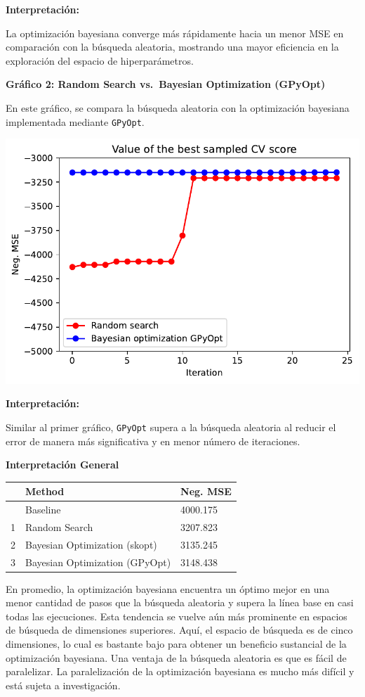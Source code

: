 \documentclass[
  12pt,
  letterpaper,
  DIV=11,
  numbers=noendperiod]{scrartcl}
\begin{document}
\textbf{Interpretación:}

La optimización bayesiana converge más rápidamente hacia un menor MSE en
comparación con la búsqueda aleatoria, mostrando una mayor eficiencia en
la exploración del espacio de hiperparámetros.

\newpage

\textbf{Gráfico 2: Random Search vs.~Bayesian Optimization (GPyOpt)}

En este gráfico, se compara la búsqueda aleatoria con la optimización
bayesiana implementada mediante \texttt{GPyOpt}.

\includegraphics{ProyFinal_OptBayesiana_2024_y_files/figure-pdf/cell-18-output-1.pdf}

\textbf{Interpretación:}

Similar al primer gráfico, \texttt{GPyOpt} supera a la búsqueda
aleatoria al reducir el error de manera más significativa y en menor
número de iteraciones.

\textbf{Interpretación General}

\begin{longtable}[]{@{}lll@{}}
\toprule\noalign{}
& Method & Neg. MSE \\
\midrule\noalign{}
\endhead
\bottomrule\noalign{}
\endlastfoot
0 & Baseline & 4000.175 \\
1 & Random Search & 3207.823 \\
2 & Bayesian Optimization (skopt) & 3135.245 \\
3 & Bayesian Optimization (GPyOpt) & 3148.438 \\
\end{longtable}

En promedio, la optimización bayesiana encuentra un óptimo mejor en una
menor cantidad de pasos que la búsqueda aleatoria y supera la línea base
en casi todas las ejecuciones. Esta tendencia se vuelve aún más
prominente en espacios de búsqueda de dimensiones superiores. Aquí, el
espacio de búsqueda es de cinco dimensiones, lo cual es bastante bajo
para obtener un beneficio sustancial de la optimización bayesiana. Una
ventaja de la búsqueda aleatoria es que es fácil de paralelizar. La
paralelización de la optimización bayesiana es mucho más difícil y está
sujeta a investigación.
\end{document}

